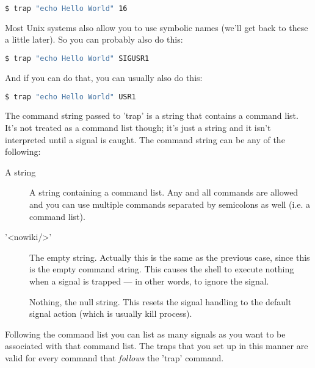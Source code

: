 \lstset{basicstyle=\scriptsize, numbers=left, captionpos=b, tabsize=4}
\begin{lstlisting}[caption=Trapping SIGUSR1,language={bash},
breaklines=true,xleftmargin=15pt,label=lstTrapping SIGUSR1:Trapping SIGUSR1]
$ trap "echo Hello World" 16
\end{lstlisting}

Most Unix systems also allow you to use symbolic names (we'll get back to these
a little later). So you can probably also do this:

\lstset{basicstyle=\scriptsize, numbers=left, captionpos=b, tabsize=4}
\begin{lstlisting}[caption=Trapping SIGUSR1 (little easier),language={bash},
breaklines=true,xleftmargin=15pt,label=lst:Trapping SIGUSR1 (little easier)]
$ trap "echo Hello World" SIGUSR1
\end{lstlisting}

And if you can do that, you can usually also do this:

\lstset{basicstyle=\scriptsize, numbers=left, captionpos=b, tabsize=4}
\begin{lstlisting}[caption=Trapping SIGUSR1 (even easier),language={bash},
breaklines=true,xleftmargin=15pt,label=lst:Trapping SIGUSR1 (even easier)]
$ trap "echo Hello World" USR1
\end{lstlisting}

The command string passed to 'trap' is a string that contains a command list.
It's not treated as a command list though; it's just a string and it isn't
interpreted until a signal is caught. The command string can be any of the
following:

\begin{description}
	\item[A string] A string containing a command list. Any and all commands
are allowed and you can use multiple commands separated by semicolons as well
(i.e. a command list).
	\item['\textless{}nowiki/\textgreater{}'] The empty string. Actually this
is the same as the previous case, since this is the empty command string. This
causes the shell to execute nothing when a signal is trapped --- in other
words, to ignore the signal.
	\item[] Nothing, the null string. This resets the signal handling to the
default signal action (which is usually kill process).
\end{description}

Following the command list you can list as many signals as you want to be
associated with that command list. The traps that you set up in this manner are
valid for every command that \emph{follows} the 'trap' command.

